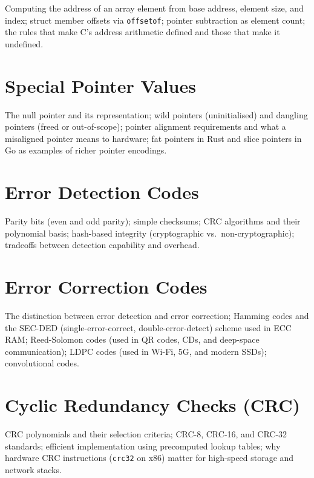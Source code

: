 Computing the address of an array element from base address, element size,
and index; struct member offsets via \texttt{offsetof}; pointer subtraction
as element count; the rules that make C's address arithmetic defined and
those that make it undefined.

\chapter{Special Pointer Values}
\label{ch:special-pointers}

The null pointer and its representation; wild pointers (uninitialised) and
dangling pointers (freed or out-of-scope); pointer alignment requirements
and what a misaligned pointer means to hardware; fat pointers in Rust and
slice pointers in Go as examples of richer pointer encodings.



\chapter{Error Detection Codes}
\label{ch:error-detection}

Parity bits (even and odd parity); simple checksums; CRC algorithms and
their polynomial basis; hash-based integrity (cryptographic vs.\
non-cryptographic); tradeoffs between detection capability and overhead.

\chapter{Error Correction Codes}
\label{ch:error-correction}

The distinction between error detection and error correction; Hamming codes
and the SEC-DED (single-error-correct, double-error-detect) scheme used in
ECC RAM; Reed-Solomon codes (used in QR codes, CDs, and deep-space
communication); LDPC codes (used in Wi-Fi, 5G, and modern SSDs);
convolutional codes.

\chapter{Cyclic Redundancy Checks (CRC)}
\label{ch:crc}

CRC polynomials and their selection criteria; CRC-8, CRC-16, and CRC-32
standards; efficient implementation using precomputed lookup tables; why
hardware CRC instructions (\texttt{crc32} on x86) matter for high-speed
storage and network stacks.


